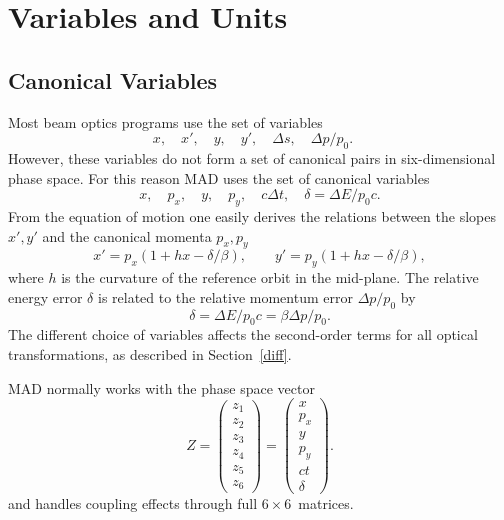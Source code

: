 \ifdraft\else
  \tableofcontents
  \listoffigures
  \listoftables
  \cleardoublepage{}
\fi

 
\chapter{Variables and Units}

\section{Canonical Variables}
Most beam optics programs use the set of variables
\[
x,\quad x',\quad y,\quad y',\quad \Delta s,\quad \Delta p / p_0.\quad
\]
However,
these variables do not form a set of canonical pairs in
six-dimensional phase space.
For this reason MAD uses the set of canonical variables
\[
x, \quad p_x, \quad y, \quad p_y, \quad c \Delta t, \quad \delta =
\Delta E / p_0 c.
\]
From the equation of motion \cite{ISE85} one easily derives the
relations between the slopes $x', y'$ and the canonical momenta
$p_x, p_y$
\[
x' = p_x (1 + hx - \delta / \beta), \qquad
y' = p_y (1 + hx - \delta / \beta),
\]
where $h$ is the curvature of the reference orbit in the mid-plane.
The relative energy error $\delta$
is related to the relative momentum error $\Delta p / p_0$ by
\[
\delta = \Delta E / p_0 c = \beta \Delta p / p_0.
\]
The different choice of variables affects the second-order terms
for all optical transformations,
as described in Section~\ref{diff}.

MAD normally works with the phase space vector
\[
Z=\left(\begin{array}{c}
z_1\\ z_2\\ z_3\\ z_4\\ z_5\\ z_6
\end{array}\right)
=\left(\begin{array}{c}
x\\ p_x\\ y\\ p_y\\ ct\\ \delta
\end{array}\right).
\]
and handles coupling effects through full $6 \times 6$~matrices.

